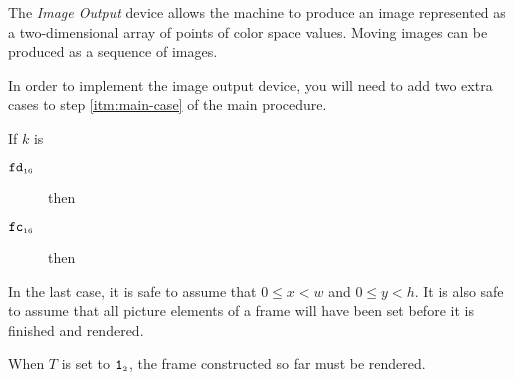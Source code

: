 \documentclass[a4paper,12pt]{article}
\newcommand{\num}[1]{\texttt{\MakeLowercase{#1}}}
\newcommand{\hex}[1]{\num{#1}_{\textup{\tiny 16}}}
\newcommand{\bin}[1]{\num{#1}_{\textup{\tiny 2}}}
\newcommand{\TERM}{T}
\newcommand{\T}{\bin{1}}
\newcommand{\proc}[1]{\textsc{#1}}
\newcommand{\deviceio}[1]{$\langle$#1$\rangle$}
\newcommand{\op}[1]{$#1$}
\theoremstyle{definition}
\newcommand{\SETPIXEL}  [1]{\op{\hex{FC}}}
\newcommand{\NEWFRAME}  [1]{\op{\hex{FD}}}
\begin{document}
The \emph{Image Output} device allows the machine to produce an image represented as a two-dimensional array of points of color space values.
Moving images can be produced as a sequence of images.

In order to implement the image output device, you will need to add two extra cases to step \ref{itm:main-case} of the main procedure.

\begin{stepnumbers}[start=3]
\item If $k$ is
  \begin{description}
  \item[\NEWFRAME{}] then
  \item[\SETPIXEL{}] then
  \end{description}
\end{stepnumbers}
In the last case, it is safe to assume that $0 \le x < w$ and $0 \le y < h$.
It is also safe to assume that all picture elements of a frame will have been set before it is finished and rendered.

When $\TERM{}$ is set to $\T$, the frame constructed so far must be rendered.
\end{document}
